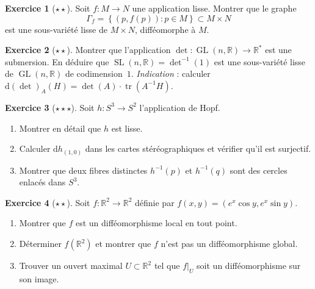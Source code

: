 \documentclass[12pt,a4paper,openany]{book}
\theoremstyle{definition}
\newtheorem{exercice}{Exercice}[chapter]
\theoremstyle{plain}
\theoremstyle{remark}
\newcommand{\R}{\mathbb{R}}
\DeclareMathOperator{\GL}{GL}
\DeclareMathOperator{\SL}{SL}
\newcommand{\dd}{\mathrm{d}}
\newcommand{\set}[1]{\left\{#1\right\}}
\begin{document}
\begin{exercice}[$\star\star$]\label{exo:graphe-sous-variete}
Soit $f \colon M \to N$ une application lisse. Montrer que le graphe
\[
    \Gamma_f = \set{(p, f(p)) : p \in M} \subset M \times N
\]
est une sous-variété lisse de $M \times N$, difféomorphe à $M$.
\end{exercice}

\begin{exercice}[$\star\star$]\label{exo:det-submersion}
Montrer que l'application $\det \colon \GL(n, \R) \to \R^*$ est une submersion.
En déduire que $\SL(n, \R) = \det^{-1}(1)$ est une sous-variété lisse de
$\GL(n, \R)$ de codimension~$1$.
\emph{Indication} : calculer $\dd(\det)_A(H) = \det(A) \cdot
\operatorname{tr}(A^{-1}H)$.
\end{exercice}

\begin{exercice}[$\star\star\star$]\label{exo:hopf-fibration-detail}
Soit $h \colon S^3 \to S^2$ l'application de Hopf.
\begin{enumerate}[label=(\alph*)]
    \item Montrer en détail que $h$ est lisse.
    \item Calculer $\dd h_{(1,0)}$ dans les cartes stéréographiques et vérifier
    qu'il est surjectif.
    \item Montrer que deux fibres distinctes $h^{-1}(p)$ et $h^{-1}(q)$ sont
    des cercles enlacés dans $S^3$.
\end{enumerate}
\end{exercice}

\begin{exercice}[$\star\star$]\label{exo:inversion-locale-application}
Soit $f \colon \R^2 \to \R^2$ définie par $f(x, y) = (e^x \cos y, e^x \sin y)$.
\begin{enumerate}[label=(\alph*)]
    \item Montrer que $f$ est un difféomorphisme local en tout point.
    \item Déterminer $f(\R^2)$ et montrer que $f$ n'est pas un difféomorphisme
    global.
    \item Trouver un ouvert maximal $U \subset \R^2$ tel que $f|_U$ soit un
    difféomorphisme sur son image.
\end{enumerate}
\end{exercice}
\end{document}
